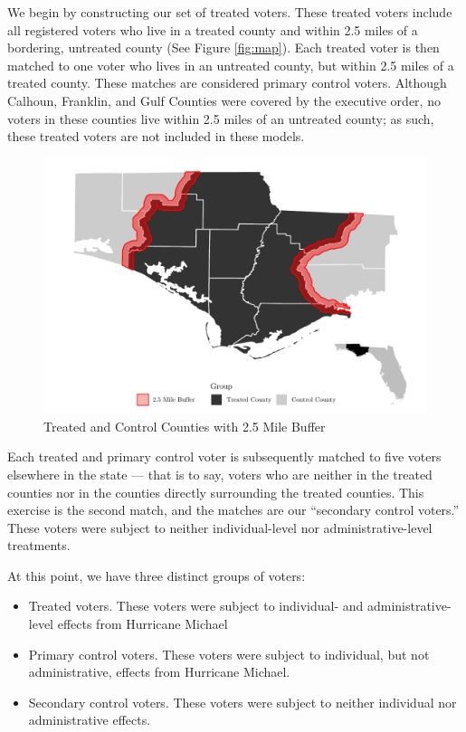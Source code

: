 \documentclass[
  12pt,
]{article}
\providecommand{\tightlist}{%
  \setlength{\itemsep}{0pt}\setlength{\parskip}{0pt}}
\begin{document}
We begin by constructing our set of treated voters. These treated voters include all registered voters who live in a treated county and within 2.5 miles of a bordering, untreated county (See Figure \ref{fig:map}). Each treated voter is then matched to one voter who lives in an untreated county, but within 2.5 miles of a treated county. These matches are considered primary control voters. Although Calhoun, Franklin, and Gulf Counties were covered by the executive order, no voters in these counties live within 2.5 miles of an untreated county; as such, these treated voters are not included in these models.

\begin{figure}[h]

{\centering \includegraphics{hurricane_michael_files/figure-latex/map-chunk-1} 

}

\caption{\label{fig:map}Treated and Control Counties with 2.5 Mile Buffer}\label{fig:map-chunk}
\end{figure}

Each treated and primary control voter is subsequently matched to five voters elsewhere in the state --- that is to say, voters who are neither in the treated counties nor in the counties directly surrounding the treated counties. This exercise is the second match, and the matches are our ``secondary control voters.'' These voters were subject to neither individual-level nor administrative-level treatments.

At this point, we have three distinct groups of voters:

\begin{itemize}
\tightlist
\item
  Treated voters. These voters were subject to individual- and administrative-level effects from Hurricane Michael
\item
  Primary control voters. These voters were subject to individual, but not administrative, effects from Hurricane Michael.
\item
  Secondary control voters. These voters were subject to neither individual nor administrative effects.
\end{itemize}
\end{document}
